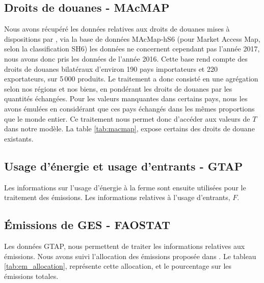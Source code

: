 \subsection{Droits de douanes - MAcMAP}

Nous avons récupéré les données relatives aux droits de douanes mises à dispositions par \cite{Guimbard2012}, via la base de données MAcMap-hS6 (pour Market Access Map, selon la classification SH6) les données ne concernent cependant pas l'année 2017, nous avons donc pris les données de l'année 2016. Cette base rend compte des droits de douanes bilatéraux d'environ 190 pays importateurs et 220 exportateurs, sur 5\,000 produits. Le traitement a donc consisté en une agrégation selon nos régions et nos biens, en pondérant les droits de douanes par les quantités échangées. Pour les valeurs manquantes dans certains pays, nous les avons émulées en considérant que ces pays échangés dans les mêmes proportions que le monde entier. Ce traitement nous permet donc d'accéder aux valeurs de $T$ dans notre modèle. La table \ref{tab:macmap}, expose certains des droits de douane existants.



\subsection{Usage d'énergie et usage d'entrants - GTAP}

Les informations sur l'usage d'énergie à la ferme sont ensuite utilisées pour le traitement des émissions. Les informations relatives à l'usage d'entrants, $F$.


\subsection{Émissions de GES - FAOSTAT}

Les données GTAP, nous permettent de traiter les informations relatives aux émissions. Nous avons suivi l'allocation des émissions proposée dans \cite{Valin2023}. Le tableau \ref{tab:em_allocation}, représente cette allocation, et le pourcentage sur les émissions totales.

